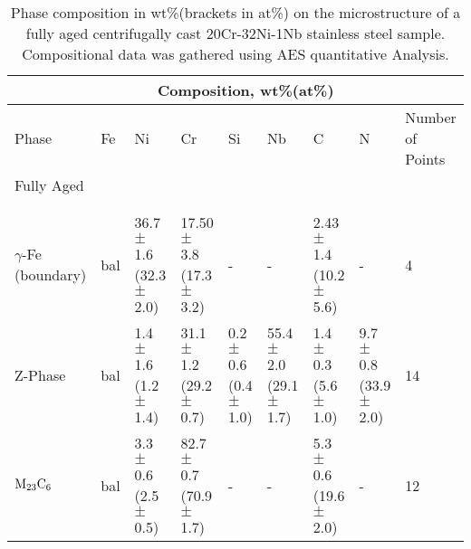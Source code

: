 \documentclass[review, 1p, number, sort&compress,table]{elsarticle}
\begin{document}
	\begin{table*}[ht!]\tiny
			\centering
			\caption{Phase composition in wt\%(brackets in at\%) on the microstructure of a fully aged centrifugally cast 20Cr-32Ni-1Nb stainless steel sample. Compositional data was gathered using AES quantitative Analysis.}

				\begin{tabular}{p{1.7cm}lllllllp{1cm}}
					\toprule%
								& \multicolumn{7}{c}{Composition, wt\%(at\%)} &  \\\hline\noalign{\smallskip}
					Phase 						& Fe 	& Ni 																									 & Cr 																									 & Si  																								    		& Nb 																			 							& C 																											& N 																							 			 	& Number of Points \\\hline\noalign{\smallskip}
					  Fully Aged  &&&&&&&& \\
					  \hline\\
					\\
	\parbox[t]{1.6cm}{$\gamma$-Fe \\(boundary)} & bal &\parbox[t]{1.6cm}{36.7 $\pm$ 1.6 \\ (32.3 $\pm$ 2.0)} 	&\parbox[t]{1.6cm}{17.50 $\pm$ 3.8 \\ (17.3 $\pm$ 3.2)}   & -   																								       & -  																		 							& \parbox[t]{1.6cm}{2.43 $\pm$ 1.4\\ (10.2 $\pm$ 5.6)}  		& - 																							 	& 4   \\[7mm]
					Z-Phase 					& bal	& \parbox[t]{1.6cm}{1.4 $\pm$ 1.6 \\ (1.2 $\pm$ 1.4)} 	& \parbox[t]{1.6cm}{31.1 $\pm$ 1.2 \\ (29.2 $\pm$ 0.7)}  & \parbox[t]{1.6cm}{0.2 $\pm$ 0.6 \\ (0.4 $\pm$ 1.0)} & \parbox[t]{1.6cm}{55.4 $\pm$ 2.0 \\ (29.1 $\pm$ 1.7)} & \parbox[t]{1.6cm}{1.4 $\pm$ 0.3 \\ (5.6 $\pm$ 1.0)} & \parbox[t]{1.6cm}{9.7 $\pm$ 0.8 \\ (33.9 $\pm$ 2.0)}   			& 14 \\[7mm]
					$\rm M_{23}C_{6}$ & bal & \parbox[t]{1.6cm}{3.3 $\pm$ 0.6 \\ (2.5 $\pm$ 0.5)} 	& \parbox[t]{1.6cm}{82.7 $\pm$ 0.7 \\ (70.9 $\pm$ 1.7)} &  -
				& -																									 	& \parbox[t]{1.6cm}{5.3 $\pm$ 0.6 \\ (19.6 $\pm$ 2.0)} 		& - 																								& 12 \\[7mm]

\end{tabular}
\end{table*}
\end{document}
